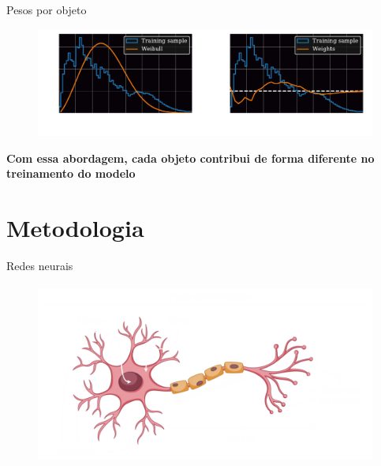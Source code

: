 \begin{frame}[c]{Pesos por objeto}
    \begin{figure}
        \centering
        \includegraphics[width=\linewidth]{script/images/weights_vs_specz.pdf}
    \end{figure}

    \textbf{Com essa abordagem, cada objeto contribui de forma diferente no treinamento do modelo}
\end{frame}

\section{Metodologia}
        

\begin{frame}[c]{Redes neurais}
    \begin{figure}
        \centering
        \includegraphics[height=6cm]{script/images/neuron_bio.png}
    \end{figure}
\end{frame}

